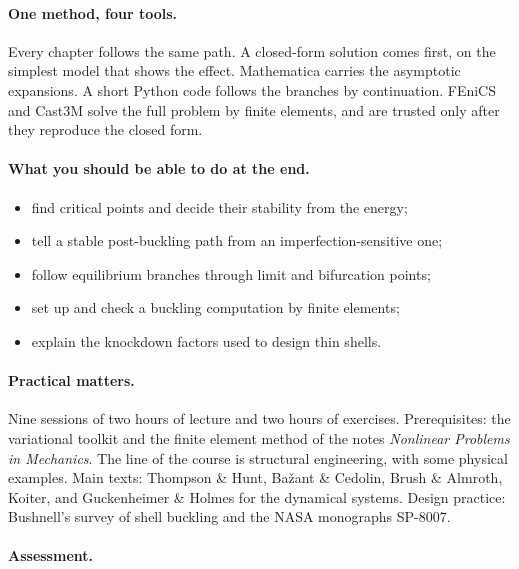 \paragraph{One method, four tools.}
Every chapter follows the same path. A closed-form solution comes first,
on the simplest model that shows the effect. Mathematica carries the
asymptotic expansions. A short Python code follows the branches by
continuation. FEniCS and Cast3M solve the full problem by finite elements,
and are trusted only after they reproduce the closed form.

\paragraph{What you should be able to do at the end.}
\begin{itemize}[itemsep=1pt]
  \item find critical points and decide their stability from the energy;
  \item tell a stable post-buckling path from an imperfection-sensitive one;
  \item follow equilibrium branches through limit and bifurcation points;
  \item set up and check a buckling computation by finite elements;
  \item explain the knockdown factors used to design thin shells.
\end{itemize}

\paragraph{Practical matters.}
Nine sessions of two hours of lecture and two hours of exercises.
Prerequisites: the variational toolkit and the finite element method of
the notes \emph{Nonlinear Problems in Mechanics}.
The line of the course is structural engineering, with some physical
examples. Main texts: Thompson \& Hunt, Ba\v{z}ant \& Cedolin, Brush \&
Almroth, Koiter, and Guckenheimer \& Holmes for the dynamical systems.
Design practice: Bushnell's survey of shell buckling and the NASA
monographs SP-8007. 

\paragraph{Assessment.}

\cleardoublepage
